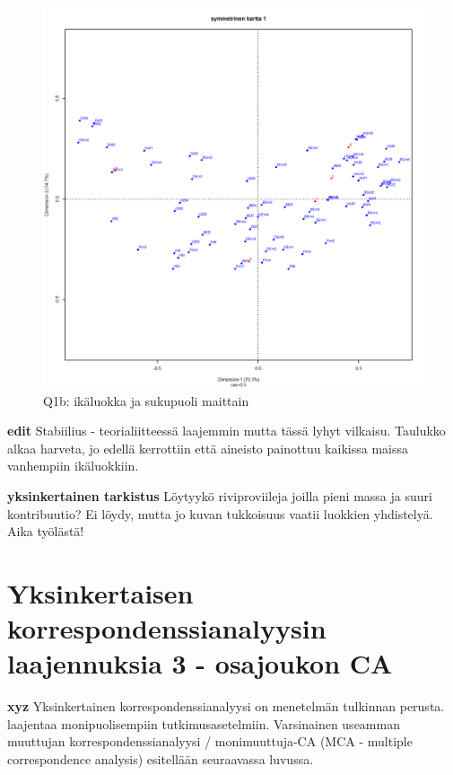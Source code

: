 \documentclass[
  finnish,
]{book}
\begin{document}
\begin{figure}

{\centering \includegraphics[width=0.9\linewidth]{JH_capaper_files/figure-latex/maagaCA1map1-1} 

}

\caption{Q1b: ikäluokka ja sukupuoli maittain}\label{fig:maagaCA1map1}
\end{figure}

\textbf{edit} Stabiilius - teorialiitteessä laajemmin mutta tässä lyhyt
vilkaisu. Taulukko alkaa harveta, jo edellä kerrottiin että aineisto
painottuu kaikissa maissa vanhempiin ikäluokkiin.

\textbf{yksinkertainen tarkistus} Löytyykö riviproviileja joilla pieni
massa ja suuri kontribuutio? Ei löydy, mutta jo kuvan tukkoisuus vaatii
luokkien yhdistelyä. Aika työlästä!

\hypertarget{yksinkertaisen-korrespondenssianalyysin-laajennuksia-3---osajoukon-ca}{%
\chapter{Yksinkertaisen korrespondenssianalyysin laajennuksia 3 -
osajoukon
CA}\label{yksinkertaisen-korrespondenssianalyysin-laajennuksia-3---osajoukon-ca}}

\textbf{xyz} Yksinkertainen korrespondenssianalyysi on menetelmän
tulkinnan perusta. laajentaa monipuolisempiin tutkimusasetelmiin.
Varsinainen useamman muuttujan korrespondenssianalyysi / monimuuttuja-CA
(MCA - multiple correspondence analysis) esitellään seuraavassa luvussa.
\end{document}
